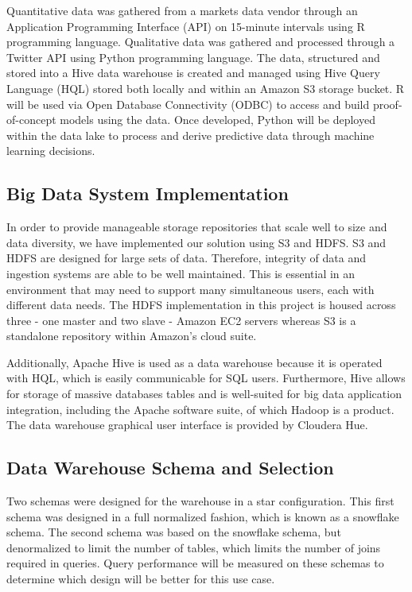 \documentclass[journal]{IEEEtran}
\begin{document}
Quantitative data was gathered from a markets data vendor through an
 Application Programming Interface (API) on 15-minute intervals using R
 programming language. 
Qualitative data was gathered and processed through a Twitter API
 using Python programming language. 
The data, structured and stored into a Hive data warehouse is created and
 managed using Hive Query Language (HQL) stored both locally and
 within an Amazon S3 storage bucket. 
R will be used via Open Database Connectivity (ODBC) to access and
 build proof-of-concept models using the data. Once developed,
 Python will be deployed within the data lake to process and
 derive predictive data through machine learning decisions.

\subsection{Big Data System Implementation}

In order to provide manageable storage repositories that scale 
 well to size and data diversity, 
 we have implemented our solution using S3 and HDFS. 
S3 and HDFS are designed for large sets of data. 
Therefore, integrity of data and ingestion systems are able
 to be well maintained. 
This is essential in an environment that may need to support 
 many simultaneous users, each with different data needs. 
The HDFS implementation in this project is housed across three 
 - one master and two slave - Amazon EC2 servers 
 whereas S3 is a standalone repository within Amazon's cloud suite.

Additionally, Apache Hive is used as a data warehouse 
 because it is operated with HQL, 
 which is easily communicable for SQL users. 
Furthermore, Hive allows for storage of massive databases tables and
 is well-suited for big data application integration, 
 including the Apache software suite, of which Hadoop is a product. 
The data warehouse graphical user interface is provided by Cloudera Hue.

\subsection{Data Warehouse Schema and Selection}

Two schemas were designed for the warehouse in a star configuration.
This first schema was designed in a full normalized fashion,
 which is known as a snowflake schema.
The second schema was based on the snowflake schema, 
 but denormalized to limit the number of tables, 
 which limits the number of joins required in queries.
Query performance will be measured on these schemas to determine
 which design will be better for this use case. 
\end{document}
